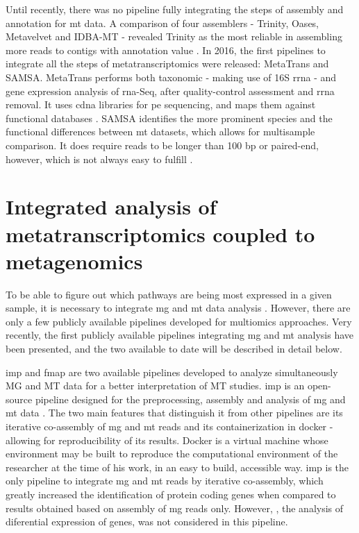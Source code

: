 \documentclass[
  oneside,
  11pt, a4paper,
  footinclude=true,
  headinclude=true,
  cleardoublepage=empty
]{scrbook}
\begin{document}
    Until recently, there was no pipeline fully integrating the steps of assembly and annotation for \gls{mt} data. A comparison of four assemblers - Trinity, Oases, Metavelvet and IDBA-MT - revealed Trinity as the most reliable in assembling more reads to contigs with annotation value \citep{Celaj2014}. 
    In 2016, the first pipelines to integrate all the steps of metatranscriptomics were released: MetaTrans and SAMSA. MetaTrans performs both taxonomic - making use of 16S \gls{rrna} - and gene expression analysis of \gls{rna}-Seq, after quality-control assessment and \gls{rrna} removal. It uses \gls{cdna} libraries for \gls{pe} sequencing, and maps them against functional databases \citep{Martinez2016}. SAMSA identifies the more prominent species and the functional differences between \gls{mt} datasets, which allows for multisample comparison. It does require reads to be longer than 100 \gls{bp} or paired-end, however, which is not always easy to fulfill \citep{Westreich2016}.
    
    \section{Integrated analysis of metatranscriptomics coupled to metagenomics}
    
    To be able to figure out which pathways are being most expressed in a given sample, it is necessary to integrate \gls{mg} and \gls{mt} data analysis \citep{Dudhagara2015, Nayfact2016}. However, there are only a few publicly available pipelines developed for multiomics approaches. Very recently, the first publicly available pipelines integrating \gls{mg} and \gls{mt} analysis have been presented, and the two available to date will be described in detail below.
    
    \gls{imp} and \gls{fmap} are two available pipelines developed to analyze simultaneously MG and MT data for a better interpretation of MT studies. \gls{imp} is an open-source pipeline designed for the preprocessing, assembly and analysis of \gls{mg} and \gls{mt} data \citep{Narayanasamy2016}. The two main features that distinguish it from other pipelines are its iterative co-assembly of \gls{mg} and \gls{mt} reads and its containerization in docker - allowing for reproducibility of its results. Docker \citep{chamberlain2014using} is a virtual machine whose environment may be built to reproduce the computational environment of the researcher at the time of his work, in an easy to build, accessible way. 
    \gls{imp} is the only pipeline to integrate \gls{mg} and \gls{mt} reads by iterative co-assembly, which greatly increased the identification of protein coding genes when compared to results obtained based on assembly of \gls{mg} reads only. However, , the analysis of diferential expression of genes,  was not considered in this pipeline.
    
\end{document}
